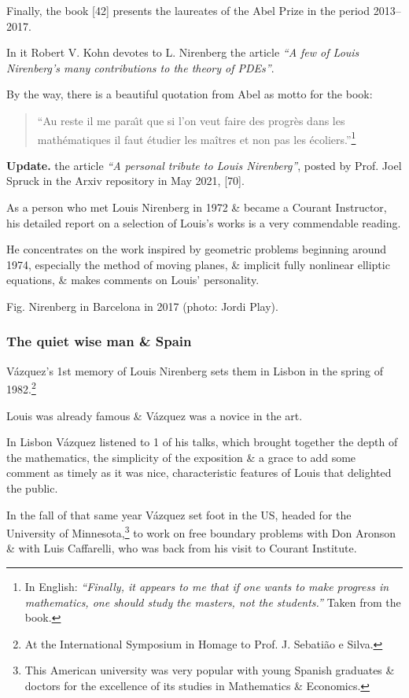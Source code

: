 \documentclass{article}
\begin{document}
Finally, the book [42] presents the laureates of the Abel Prize in the period 2013--2017.

In it Robert V. Kohn devotes to L. Nirenberg the article \textit{``A few of Louis Nirenberg's many contributions to the theory of PDEs''}.

By the way, there is a beautiful quotation from Abel as motto for the book:
\begin{quotation}
	``Au reste il me para\^{\i}t que si l'on veut faire des progr\`es dans les math\'ematiques il faut \'etudier les maîtres et non pas les \'ecoliers.''\footnote{In English: \textit{``Finally, it appears to me that if one wants to make progress in mathematics, one should study the masters, not the students.''} Taken from the book.}
\end{quotation}
\textbf{Update.} the article \textit{``A personal tribute to Louis Nirenberg''}, posted by Prof. Joel Spruck in the Arxiv repository in May 2021, [70].

As a person who met Louis Nirenberg in 1972 \& became a Courant Instructor, his detailed report on a selection of Louis's works is a very commendable reading.

He concentrates on the work inspired by geometric problems beginning around 1974, especially the method of moving planes, \& implicit fully nonlinear elliptic equations, \& makes comments on Louis' personality.

\textsf{Fig. Nirenberg in Barcelona in 2017 (photo: Jordi Play).}

\subsubsection{The quiet wise man \& Spain}
V\'azquez's 1st memory of Louis Nirenberg sets them in Lisbon in the spring of 1982.\footnote{At the International Symposium in Homage to Prof. J. Sebati\~ao e Silva.}

Louis was already famous \& V\'azquez was a novice in the art.

In Lisbon V\'azquez listened to 1 of his talks, which brought together the depth of the mathematics, the simplicity of the exposition \& a grace to add some comment as timely as it was nice, characteristic features of Louis that delighted the public.

%
In the fall of that same year V\'azquez set foot in the US, headed for the University of Minnesota,\footnote{This American university was very popular with young Spanish graduates \& doctors for the excellence of its studies in Mathematics \& Economics.} to work on free boundary problems with Don Aronson \& with Luis Caffarelli, who was back from his visit to Courant Institute.
\end{document}
